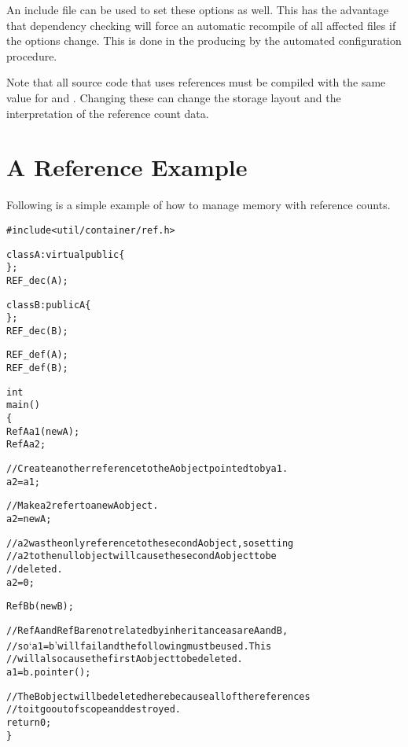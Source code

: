   An include file can be used to set these options as well.  This has
the advantage that dependency checking will force an automatic
recompile of all affected files if the options change.  This is done
in the  producing by the automated configuration
procedure.

  Note that all source code that uses references must be compiled with
the same value for  and .
Changing these can change the storage layout and the interpretation of
the reference count data.

\section{A Reference Example}

Following is a simple example of how to manage memory with reference
counts.

\begin{alltt}
#include <util/container/ref.h>

class A: virtual public  \{
\};
REF_dec(A);

class B: public A \{
\};
REF_dec(B);

REF_def(A);
REF_def(B);

int
main()
\{
  RefA a1(new A);
  RefA a2;

  // Create another reference to the A object pointed to by a1.
  a2 = a1;

  // Make a2 refer to a new A object.
  a2 = new A;

  // a2 was the only reference to the second A object, so setting
  // a2 to the null object will cause the second A object to be
  // deleted.
  a2 = 0;

  RefB b(new B);

  // RefA and RefB are not related by inheritance as are A and B,
  // so `a1 = b' will fail and the following must be used.  This
  // will also cause the first A object to be deleted.
  a1 = b.pointer();

  // The B object will be deleted here because all of the references
  // to it go out of scope and destroyed.
  return 0;
\}
\end{alltt}
